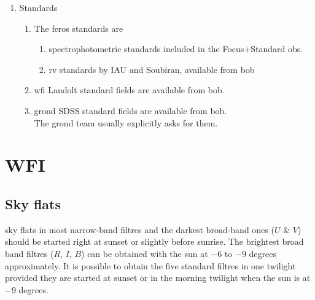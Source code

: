 \documentclass[11pt,fleqn,a4paper]{book}
\begin{document}
\begin{enumerate}
\begin{enumerate}
    \end{enumerate} 
    \item Standards
    \begin{enumerate}
        \item The \gls{feros} standards are
        \begin{enumerate}
            \item \Glspl{spectrophotometric standard} included in the Focus+Standard \glspl{ob}.
            \item \Glspl{rv standard} by IAU and Soubiran, available from \gls{bob}
        \end{enumerate}
        \item \gls{wfi} Landolt \glspl{standard field} are available from \gls{bob}.
        \item \gls{grond} SDSS \glspl{standard field} are available from \gls{bob}.\\
            The \gls{grond} team usually explicitly asks for them.    
    \end{enumerate}
\end{enumerate}

\section{WFI}
\subsection{Sky flats}
\label{sec:wfiflats}
\Gls{sky flats} in most narrow-band filtres and the darkest broad-band ones ($U$ \& $V$) should be started right at sunset or slightly before sunrise.  The brightest
broad band filtres ($R$, $I$, $B$) can be obtained with the sun at $-6$ to
$-9$ degrees approximately.  It is possible to obtain the five standard filtres in one twilight provided they are started at sunset or in the morning twilight when the sun is at $-9$ degrees.
\end{document}
